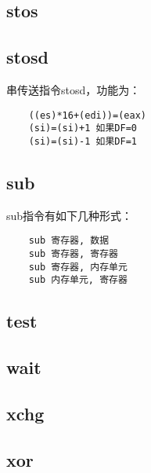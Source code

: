 \documentclass[a4paper,left=2.5cm,right=2.5cm,11pt]{article}
\begin{document}
\subsection{stos}
\subsection{stosd}
	串传送指令stosd，功能为：
	\begin{lstlisting}
	((es)*16+(edi))=(eax)
	(si)=(si)+1 如果DF=0
	(si)=(si)-1 如果DF=1
	\end{lstlisting}

\subsection{sub}
	sub指令有如下几种形式：
	\begin{lstlisting}
	sub 寄存器, 数据
	sub 寄存器, 寄存器
	sub 寄存器, 内存单元
	sub 内存单元, 寄存器
	\end{lstlisting}
	
\subsection{test}
\subsection{wait}
\subsection{xchg}
\subsection{xor}
\end{document}
